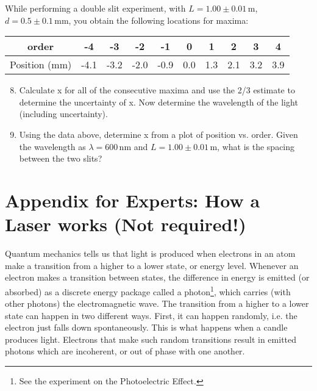 While performing a double slit experiment, with $L = 1.00\pm 0.01\,\mathrm{m}$, $d = 0.5\pm 0.1\, \mathrm{mm}$, you obtain the following locations for maxima:
\begin{table}[h]
  \centering
  \begin{tabular}{|c|c|c|c|c|c|c|c|c|c|}
    \hline
    order&-4&-3&-2&-1&0&1&2&3&4\\
    \hline
    Position (mm)&-4.1&-3.2&-2.0&-0.9&0.0&1.3&2.1&3.2&3.9\\
    \hline
  \end{tabular}
\end{table}
\begin{enumerate}\setcounter{enumi}{7}
\item Calculate x for all of the consecutive maxima and use the 2/3 estimate to determine the uncertainty of x. Now determine the wavelength of the light (including uncertainty).
\item Using the data above, determine x from a plot of position vs. order. Given the wavelength as $\lambda = 600\,\mathrm{nm}$ and $L = 1.00\pm 0.01\,\mathrm{m}$, what is the spacing between the two slits?
\end{enumerate}

\section{Appendix for Experts: How a Laser works (Not required!)}
Quantum mechanics tells us that light is produced when electrons in an atom make a transition from a higher to a lower state, or energy level. Whenever an electron makes a
transition between states, the difference in energy is emitted (or absorbed) as a discrete energy package called a photon\footnote{See the experiment on the Photoelectric Effect.}, which carries (with other photons) the electromagnetic wave. The transition from a higher to a lower state can happen in two different ways. First, it can happen randomly, i.e. the electron just falls down spontaneously. This is what happens when a candle produces light. Electrons that make such random transitions result in emitted photons which are incoherent, or out of phase with one another. \myskip

